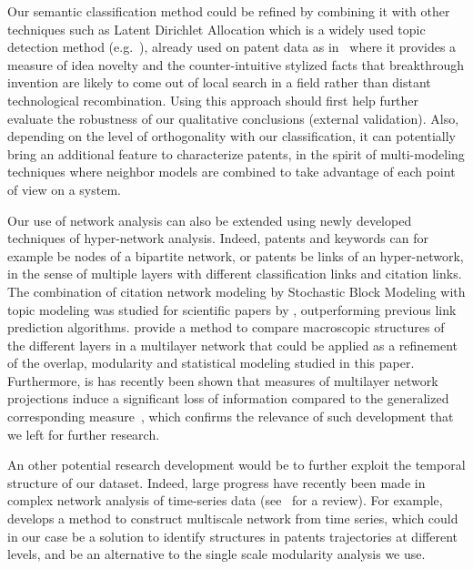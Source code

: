 Our semantic classification method could be refined by combining it with other techniques such as Latent Dirichlet Allocation which is a widely used topic detection method (e.g.~\cite{blei2003latent}), already used on patent data as in~\cite{kaplan2015double} where it provides a measure of idea novelty and the counter-intuitive stylized facts that breakthrough invention are likely to come out of local search in a field rather than distant technological recombination. Using this approach should first help further evaluate the robustness of our qualitative conclusions (external validation). Also, depending on the level of orthogonality with our classification, it can potentially bring an additional feature to characterize patents, in the spirit of multi-modeling techniques where neighbor models are combined to take advantage of each point of view on a system.

Our use of network analysis can also be extended using newly developed techniques of hyper-network analysis. Indeed, patents and keywords can for example be nodes of a bipartite network, or patents be links of an hyper-network, in the sense of multiple layers with different classification links and citation links. The combination of citation network modeling by Stochastic Block Modeling with topic modeling was studied for scientific papers by \cite{zhu2013scalable}, outperforming previous link prediction algorithms. \cite{iacovacci2015mesoscopic} provide a method to compare macroscopic structures of the different layers in a multilayer network that could be applied as a refinement of the overlap, modularity and statistical modeling studied in this paper. Furthermore, is has recently been shown that measures of multilayer network projections induce a significant loss of information compared to the generalized corresponding measure~\cite{de2015ranking}, which confirms the relevance of such development that we left for further research.

An other potential research development would be to further exploit the temporal structure of our dataset. Indeed, large progress have recently been made in complex network analysis of time-series data (see~\cite{gao2017complex} for a review). For example,~\cite{gao2015multiscale} develops a method to construct multiscale network from time series, which could in our case be a solution to identify structures in patents trajectories at different levels, and be an alternative to the single scale modularity analysis we use.



